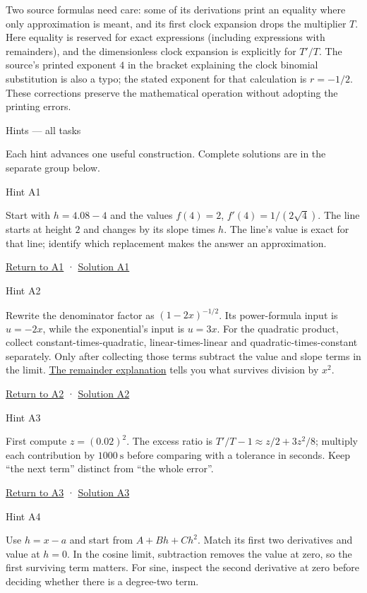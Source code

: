 \documentclass[
  11pt,
]{article}
\begin{document}
Two source formulas need care: some of its derivations print an equality
where only approximation is meant, and its first clock expansion drops
the multiplier \(T\). Here equality is reserved for exact expressions
(including expressions with remainders), and the dimensionless clock
expansion is explicitly for \(T'/T\). The source's printed exponent
\(4\) in the bracket explaining the clock binomial substitution is also
a typo; the stated exponent for that calculation is \(r=-1/2\). These
corrections preserve the mathematical operation without adopting the
printing errors.

Hints --- all tasks

Each hint advances one useful construction. Complete solutions are in
the separate group below.

Hint A1

Start with \(h=4.08-4\) and the values \(f(4)=2\),
\(f'(4)=1/(2\sqrt4)\). The line starts at height \(2\) and changes by
its slope times \(h\). The line's value is exact for that line; identify
which replacement makes the answer an approximation.

\protect\hyperlink{a1}{Return to A1} · \protect\hyperlink{s1}{Solution
A1}

Hint A2

Rewrite the denominator factor as \((1-2x)^{-1/2}\). Its power-formula
input is \(u=-2x\), while the exponential's input is \(u=3x\). For the
quadratic product, collect constant-times-quadratic, linear-times-linear
and quadratic-times-constant separately. Only after collecting those
terms subtract the value and slope terms in the limit.
\protect\hyperlink{quadratic}{The remainder explanation} tells you what
survives division by \(x^2\).

\protect\hyperlink{a2}{Return to A2} · \protect\hyperlink{s2}{Solution
A2}

Hint A3

First compute \(z=(0.02)^2\). The excess ratio is
\(T'/T-1\approx z/2+3z^2/8\); multiply each contribution by
\(1000\ \mathrm{s}\) before comparing with a tolerance in seconds. Keep
``the next term'' distinct from ``the whole error''.

\protect\hyperlink{a3}{Return to A3} · \protect\hyperlink{s3}{Solution
A3}

Hint A4

Use \(h=x-a\) and start from \(A+Bh+Ch^2\). Match its first two
derivatives and value at \(h=0\). In the cosine limit, subtraction
removes the value at zero, so the first surviving term matters. For
sine, inspect the second derivative at zero before deciding whether
there is a degree-two term.
\end{document}
